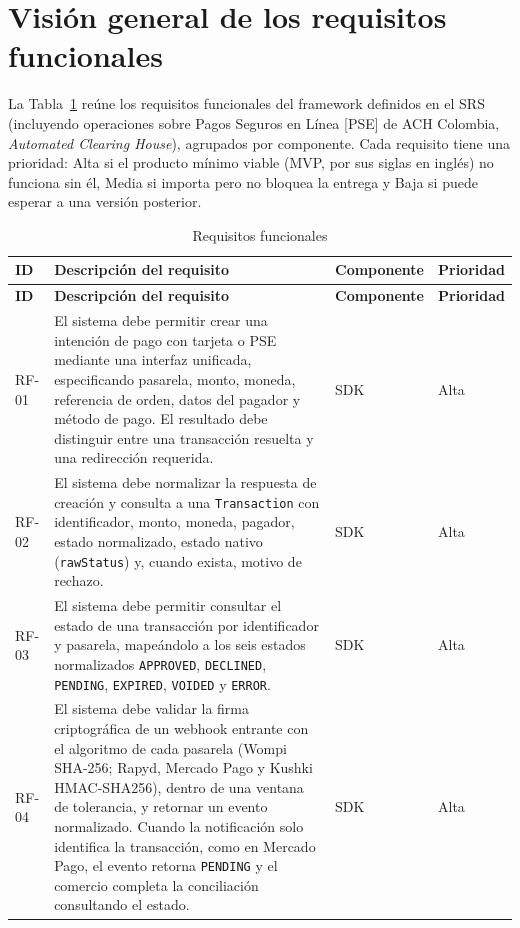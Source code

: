 \section{Visión general de los requisitos funcionales}
La Tabla~\ref{tab:req_func} reúne los requisitos funcionales del framework definidos en el SRS (incluyendo operaciones sobre Pagos Seguros en Línea [PSE] de ACH Colombia, \textit{Automated Clearing House}), agrupados por componente. Cada requisito tiene una prioridad: Alta si el producto mínimo viable (MVP, por sus siglas en inglés) no funciona sin él, Media si importa pero no bloquea la entrega y Baja si puede esperar a una versión posterior.

\begingroup
\renewcommand{\arraystretch}{1.3}
\begin{longtable}{|l|>{\raggedright\arraybackslash}p{}|>{\raggedright\arraybackslash}p{}|l|}
\caption{Requisitos funcionales}
\label{tab:req_func}\\
\hline
\textbf{ID} & \textbf{Descripción del requisito} & \textbf{Componente} & \textbf{Prioridad} \\ \hline
\endfirsthead
\hline
\textbf{ID} & \textbf{Descripción del requisito} & \textbf{Componente} & \textbf{Prioridad} \\ \hline
\endhead
RF-01 & El sistema debe permitir crear una intención de pago con tarjeta o PSE mediante una interfaz unificada, especificando pasarela, monto, moneda, referencia de orden, datos del pagador y método de pago. El resultado debe distinguir entre una transacción resuelta y una redirección requerida. & SDK & Alta \\ \hline
RF-02 & El sistema debe normalizar la respuesta de creación y consulta a una \texttt{Transaction} con identificador, monto, moneda, pagador, estado normalizado, estado nativo (\texttt{rawStatus}) y, cuando exista, motivo de rechazo. & SDK & Alta \\ \hline
RF-03 & El sistema debe permitir consultar el estado de una transacción por identificador y pasarela, mapeándolo a los seis estados normalizados \texttt{APPROVED}, \texttt{DECLINED}, \texttt{PENDING}, \texttt{EXPIRED}, \texttt{VOIDED} y \texttt{ERROR}. & SDK & Alta \\ \hline
RF-04 & El sistema debe validar la firma criptográfica de un webhook entrante con el algoritmo de cada pasarela (Wompi SHA-256; Rapyd, Mercado Pago y Kushki HMAC-SHA256), dentro de una ventana de tolerancia, y retornar un evento normalizado. Cuando la notificación solo identifica la transacción, como en Mercado Pago, el evento retorna \texttt{PENDING} y el comercio completa la conciliación consultando el estado. & SDK & Alta \\ \hline

\end{longtable}
